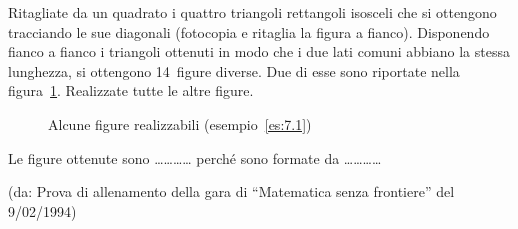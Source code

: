 \noindent\begin{minipage}{0.65\textwidth}\parindent15pt
\begin{esempio}\label{es:7.1}
Ritagliate da un quadrato i quattro triangoli rettangoli isosceli che 
si ottengono tracciando le sue diagonali (fotocopia e ritaglia la 
figura a fianco). Disponendo fianco a fianco i triangoli ottenuti in 
modo che i due lati comuni abbiano la stessa lunghezza, si ottengono 
14~figure diverse. Due di esse sono riportate nella 
figura~\ref{fig:quadrato2}. Realizzate tutte le altre figure.
\end{esempio}
\end{minipage}\hfil
\begin{minipage}{0.35\textwidth}
  \centering
\end{minipage}\vspace{5pt}


\begin{inaccessibleblock}
 \begin{figure}[!htb]
\centering
\caption{Alcune figure realizzabili 
(esempio~\ref{es:7.1})}\label{fig:quadrato2}
\end{figure}
\end{inaccessibleblock}

Le figure ottenute sono \ldots\ldots\ldots\ldots{} perché sono 
formate da \ldots\ldots\ldots\ldots{}

\noindent(da: Prova di allenamento della gara di ``Matematica senza 
frontiere'' del 9/02/1994)


